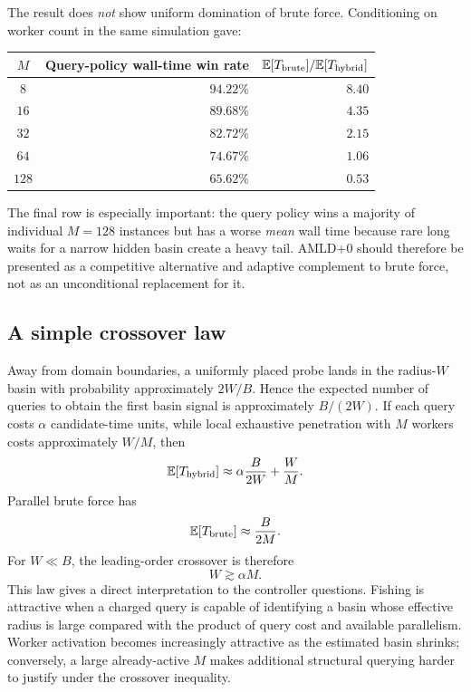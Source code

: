 \documentclass[11pt]{article}
\theoremstyle{definition}
\begin{document}
The result does \emph{not} show uniform domination of brute force. Conditioning on worker count in the same simulation gave:
\begin{center}
\begin{tabular}{@{}crr@{}}
\toprule
$M$ & Query-policy wall-time win rate & $\mathbb E[T_{\rm brute}]/\mathbb E[T_{\rm hybrid}]$ \\
\midrule
$8$   & $94.22\%$ & $8.40$ \\
$16$  & $89.68\%$ & $4.35$ \\
$32$  & $82.72\%$ & $2.15$ \\
$64$  & $74.67\%$ & $1.06$ \\
$128$ & $65.62\%$ & $0.53$ \\
\bottomrule
\end{tabular}
\end{center}
The final row is especially important: the query policy wins a majority of individual $M=128$ instances but has a worse \emph{mean} wall time because rare long waits for a narrow hidden basin create a heavy tail. AMLD+0 should therefore be presented as a competitive alternative and adaptive complement to brute force, not as an unconditional replacement for it.


\subsection{A simple crossover law}

Away from domain boundaries, a uniformly placed probe lands in the radius-$W$ basin with probability approximately $2W/B$.  Hence the expected number of queries to obtain the first basin signal is approximately $B/(2W)$.  If each query costs $\alpha$ candidate-time units, while local exhaustive penetration with $M$ workers costs approximately $W/M$, then
\[
\mathbb E[T_{\rm hybrid}]
\approx
\alpha\frac{B}{2W}+\frac{W}{M}.
\]
Parallel brute force has
\[
\mathbb E[T_{\rm brute}]
\approx
\frac{B}{2M}.
\]
For $W\ll B$, the leading-order crossover is therefore
\[
\boxed{W\gtrsim \alpha M.}
\]
This law gives a direct interpretation to the controller questions.  Fishing is attractive when a charged query is capable of identifying a basin whose effective radius is large compared with the product of query cost and available parallelism.  Worker activation becomes increasingly attractive as the estimated basin shrinks; conversely, a large already-active $M$ makes additional structural querying harder to justify under the crossover inequality.
\end{document}
